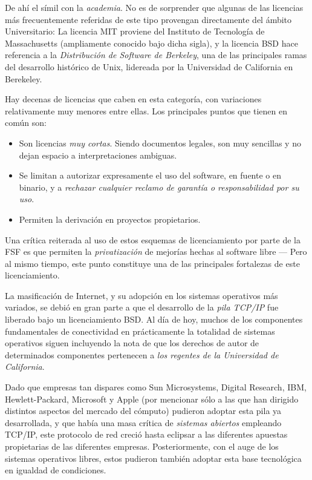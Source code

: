 \documentclass[11pt,fleqn]{book} %
\begin{document}
De ahí el símil con la \emph{academia}. No es de sorprender que algunas de
las licencias más frecuentemente referidas de este tipo provengan
directamente del ámbito Universitario: La licencia MIT proviene del
Instituto de Tecnología de Massachusetts (ampliamente conocido bajo
dicha sigla), y la licencia BSD hace referencia a la \emph{Distribución de Software de Berkeley}, una de las principales ramas del desarrollo
histórico de Unix, lidereada por la Universidad de California en
Berekeley.

Hay decenas de licencias que caben en esta categoría, con variaciones
relativamente muy menores entre ellas. Los principales puntos que
tienen en común son:

\begin{itemize}
\item Son licencias \emph{muy cortas}. Siendo documentos legales, son muy
  sencillas y no dejan espacio a interpretaciones ambiguas.
\item Se limitan a autorizar expresamente el uso del software, en fuente o
  en binario, y a \emph{rechazar cualquier reclamo de garantía o   responsabilidad por su uso}.
\item Permiten la derivación en proyectos propietarios.
\end{itemize}

Una crítica reiterada al uso de estos esquemas de licenciamiento por
parte de la FSF es que permiten la \emph{privatización} de mejorías hechas
al software libre — Pero al mismo tiempo, este punto constituye una de
las principales fortalezas de este licenciamiento.

La masificación de Internet, y su adopción en los sistemas operativos
más variados, se debió en gran parte a que el desarrollo de la \emph{pila TCP/IP} fue liberado bajo un licenciamiento BSD. Al día de hoy, muchos
de los componentes fundamentales de conectividad en prácticamente la
totalidad de sistemas operativos siguen incluyendo la nota de que los
derechos de autor de determinados componentes pertenecen a \emph{los regentes de la Universidad de California}.

Dado que empresas tan dispares como Sun Microsystems, Digital
Research, IBM, Hewlett-Packard, Microsoft y Apple (por mencionar sólo
a las que han dirigido distintos aspectos del mercado del cómputo)
pudieron adoptar esta pila ya desarrollada, y que había una masa
crítica de \emph{sistemas abiertos} empleando TCP/IP, este protocolo de red
creció hasta eclipsar a las diferentes apuestas propietarias de las
diferentes empresas. Posteriormente, con el auge de los sistemas
operativos libres, estos pudieron también adoptar esta base
tecnológica en igualdad de condiciones.
\end{document}

